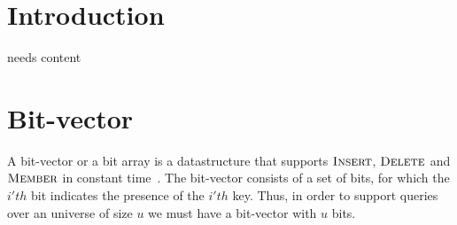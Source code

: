 \documentclass[oneside,11pt,openright]{report}
\newcommand{\Insert}{\textsc{Insert}}
\newcommand{\Delete}{\textsc{Delete}}
\newcommand{\Member}{\textsc{Member}}
\begin{document}

\pagestyle{empty} 
\vspace*{\fill}
\clearpage


\tableofcontents
{}
\setcounter{secnumdepth}{2}


\chapter{Introduction}

needs content

\chapter{Bit-vector}

A  bit-vector  or  a  bit  array  is  a  datastructure  that  supports
$\Insert$,      $\Delete$      and     $\Member$      in      constant
time~\cite[p. 532]{ITA09}. The  bit-vector consists of a  set of bits,
for  which  the  $i'th$  bit  indicates the  presence  of  the  $i'th$
key. Thus, in order to support queries over an universe of size $u$ we
must have a bit-vector with $u$ bits.
\end{document}
